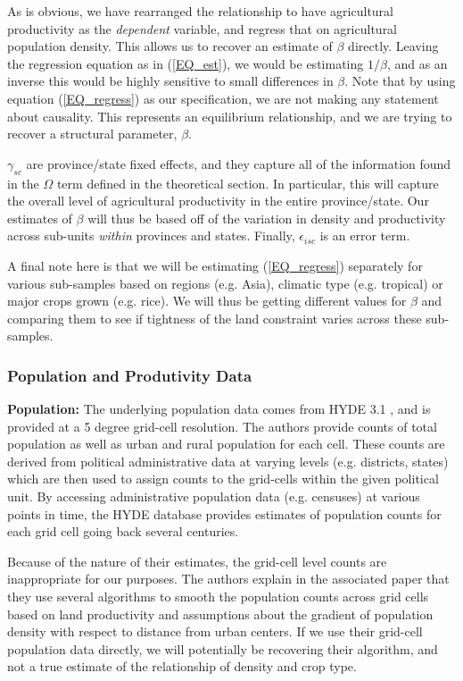 \documentclass[11pt]{article}
\begin{document}
As is obvious, we have rearranged the relationship to have agricultural productivity as the \textit{dependent} variable, and regress that on agricultural population density. This allows us to recover an estimate of $\beta$ directly. Leaving the regression equation as in (\ref{EQ_est}), we would be estimating $1/\beta$, and as an inverse this would be highly sensitive to small differences in $\beta$. Note that by using equation (\ref{EQ_regress}) as our specification, we are not making any statement about causality. This represents an equilibrium relationship, and we are trying to recover a structural parameter, $\beta$.

$\gamma_{sc}$ are province/state fixed effects, and they capture all of the information found in the $\Omega$ term defined in the theoretical section. In particular, this will capture the overall level of agricultural productivity in the entire province/state. Our estimates of $\beta$ will thus be based off of the variation in density and productivity across sub-units \textit{within} provinces and states. Finally, $\epsilon_{isc}$ is an error term.

A final note here is that we will be estimating (\ref{EQ_regress}) separately for various sub-samples based on regions (e.g. Asia), climatic type (e.g. tropical) or major crops grown (e.g. rice). We will thus be getting different values for $\beta$ and comparing them to see if tightness of the land constraint varies across these sub-samples.

\subsubsection{Population and Produtivity Data}

\vspace{.5cm}\noindent\textbf{Population:} The underlying population data comes from HYDE 3.1 \citep{hyde31}, and is provided at a 5 degree grid-cell resolution. The authors provide counts of total population as well as urban and rural population for each cell. These counts are derived from political administrative data at varying levels (e.g. districts, states) which are then used to assign counts to the grid-cells within the given political unit. By accessing administrative population data (e.g. censuses) at various points in time, the HYDE database provides estimates of population counts for each grid cell going back several centuries.

Because of the nature of their estimates, the grid-cell level counts are inappropriate for our purposes. The authors explain in the associated paper that they use several algorithms to smooth the population counts across grid cells based on land productivity and assumptions about the gradient of population density with respect to distance from urban centers. If we use their grid-cell population data directly, we will potentially be recovering their algorithm, and not a true estimate of the relationship of density and crop type.
\end{document}
